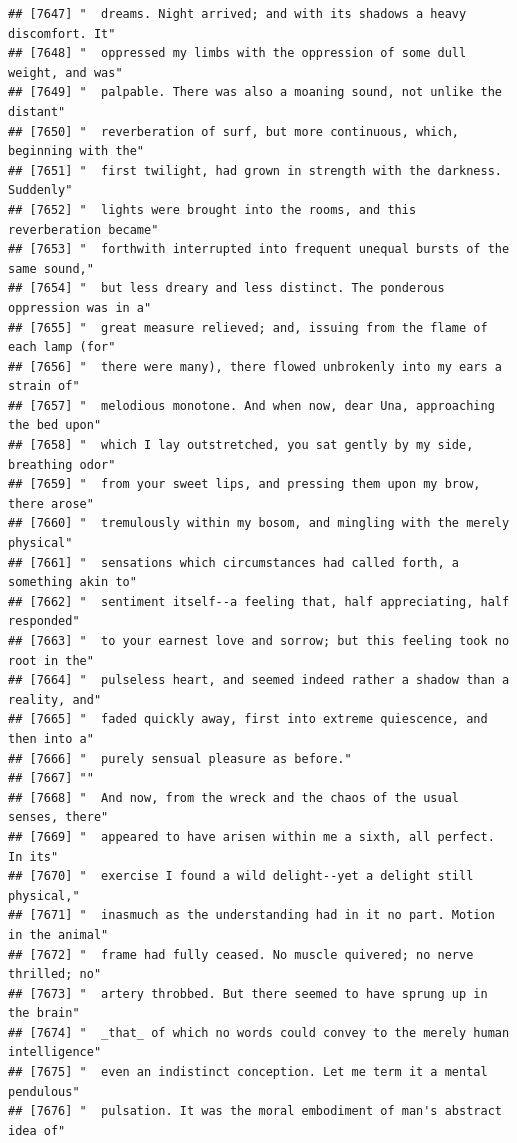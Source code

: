 \documentclass{article}\usepackage[]{graphicx}\usepackage[]{color}
\makeatletter
\newenvironment{kframe}{%
 \def\at@end@of@kframe{}%
 \ifinner\ifhmode%
  \def\at@end@of@kframe{\end{minipage}}%
  \begin{minipage}{\columnwidth}%
 \fi\fi%
 \def\FrameCommand##1{\hskip\@totalleftmargin \hskip-\fboxsep
 \colorbox{shadecolor}{##1}\hskip-\fboxsep
     \hskip-\linewidth \hskip-\@totalleftmargin \hskip\columnwidth}%
 \MakeFramed {\advance\hsize-\width
   \@totalleftmargin\z@ \linewidth\hsize
   \@setminipage}}%
 {\par\unskip\endMakeFramed%
 \at@end@of@kframe}
\newenvironment{knitrout}{}{} %
\makeatother
\begin{document}
\begin{knitrout}
\begin{kframe}
\begin{verbatim}
## [7647] "  dreams. Night arrived; and with its shadows a heavy discomfort. It"        
## [7648] "  oppressed my limbs with the oppression of some dull weight, and was"       
## [7649] "  palpable. There was also a moaning sound, not unlike the distant"          
## [7650] "  reverberation of surf, but more continuous, which, beginning with the"     
## [7651] "  first twilight, had grown in strength with the darkness. Suddenly"         
## [7652] "  lights were brought into the rooms, and this reverberation became"         
## [7653] "  forthwith interrupted into frequent unequal bursts of the same sound,"     
## [7654] "  but less dreary and less distinct. The ponderous oppression was in a"      
## [7655] "  great measure relieved; and, issuing from the flame of each lamp (for"     
## [7656] "  there were many), there flowed unbrokenly into my ears a strain of"        
## [7657] "  melodious monotone. And when now, dear Una, approaching the bed upon"      
## [7658] "  which I lay outstretched, you sat gently by my side, breathing odor"       
## [7659] "  from your sweet lips, and pressing them upon my brow, there arose"         
## [7660] "  tremulously within my bosom, and mingling with the merely physical"        
## [7661] "  sensations which circumstances had called forth, a something akin to"      
## [7662] "  sentiment itself--a feeling that, half appreciating, half responded"       
## [7663] "  to your earnest love and sorrow; but this feeling took no root in the"     
## [7664] "  pulseless heart, and seemed indeed rather a shadow than a reality, and"    
## [7665] "  faded quickly away, first into extreme quiescence, and then into a"        
## [7666] "  purely sensual pleasure as before."                                        
## [7667] ""                                                                            
## [7668] "  And now, from the wreck and the chaos of the usual senses, there"          
## [7669] "  appeared to have arisen within me a sixth, all perfect. In its"            
## [7670] "  exercise I found a wild delight--yet a delight still physical,"            
## [7671] "  inasmuch as the understanding had in it no part. Motion in the animal"     
## [7672] "  frame had fully ceased. No muscle quivered; no nerve thrilled; no"         
## [7673] "  artery throbbed. But there seemed to have sprung up in the brain"          
## [7674] "  _that_ of which no words could convey to the merely human intelligence"    
## [7675] "  even an indistinct conception. Let me term it a mental pendulous"          
## [7676] "  pulsation. It was the moral embodiment of man's abstract idea of"          

\end{verbatim}
\end{kframe}
\end{knitrout}
\end{document}
